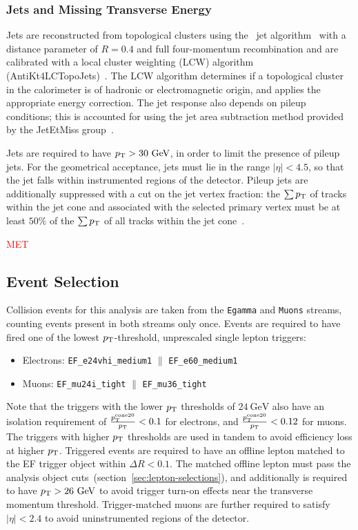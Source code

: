 \subsubsection{Jets and Missing Transverse Energy}

Jets are reconstructed from topological clusters using the \antikt\ jet algorithm~\cite{Cacciari:2008gp} with a distance parameter of $R = 0.4$ and full four-momentum recombination and are calibrated with a local cluster weighting (LCW) algorithm ({AntiKt4LCTopoJets})~\cite{ATLAS-CONF-2010-053}. The LCW algorithm determines if a topological cluster in the calorimeter is of hadronic or electromagnetic origin, and applies the appropriate energy correction. The jet response also depends on pileup conditions; this is accounted for using the jet area subtraction method provided by the JetEtMiss group~\cite{JetEtmissRecommendations2012}.

Jets are required to have $p_{\text{T}}>30~\mbox{GeV}$, in order to limit the presence of pileup jets. For the geometrical acceptance, jets must lie in the range $|\eta|<4.5$, so that the jet falls within instrumented regions of the detector. Pileup jets are additionally suppressed with a cut on the jet vertex fraction: the $\sum p_{\text{T}}$ of tracks within the jet cone and associated with the selected primary vertex must be at least $50\%$ of the $\sum p_{\text{T}}$ of all tracks within the jet cone~\cite{jvf}. 

\textcolor{red}{MET}




\subsection{Event Selection}


Collision events for this analysis are taken from the \verb.Egamma. and \verb.Muons. streams, counting events present in both streams only once. Events are required to have fired one of the lowest $p_{\text{T}}$-threshold, unprescaled single lepton triggers:

\begin{itemize}
	\item Electrons: \verb.EF_e24vhi_medium1. $\parallel$ \verb.EF_e60_medium1.
	\item Muons: \verb.EF_mu24i_tight. $\parallel$ \verb.EF_mu36_tight.
\end{itemize}

Note that the triggers with the lower $p_{\text{T}}$ thresholds of $24~\mbox{GeV}$ also have an isolation requirement of $\frac{p_{\text{T}}^{\mathrm{cone}20}}{p_{\text{T}}}<0.1$ for electrons, and $\frac{p_{\text{T}}^{\mathrm{cone}20}}{p_{\text{T}}}<0.12$ for muons. The triggers with higher $p_{\text{T}}$ thresholds are used in tandem to avoid efficiency loss at higher $p_{\text{T}}$. 
Triggered events are required to have an offline lepton matched to the EF trigger object within $\Delta R<0.1$. The matched offline lepton must pass the analysis object cuts~(section~\ref{sec:lepton-selections}), and additionally is required to have $p_{\text{T}}>26~\mbox{GeV}$ to avoid trigger turn-on effects near the transverse momentum threshold. Trigger-matched muons are further required to satisfy $|\eta|<2.4$ to avoid uninstrumented regions of the detector.

